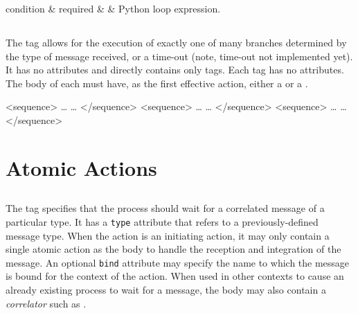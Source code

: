 \begin{attrDefs}
condition	&	required	&			& Python loop expression. \\
\end{attrDefs}

\subsection{}

The  tag allows for the execution of exactly one
of many branches determined by the type of message received,
or a time-out (note, time-out not implemented yet).  It has
no attributes and directly contains only  tags.
Each  tag has no attributes.  The body of each
 must have, as the first effective action, 
either a  or a .

\begin{codelisting}
        <sequence>
            \dots
            \dots
        </sequence>
        <sequence>
            \dots
            \dots
        </sequence>
        <sequence>
            \dots
            \dots
        </sequence>
\end{codelisting}



\section{Atomic Actions}

\subsection{}

The  tag specifies that the process should wait
for a correlated message of a particular type.  It has a \verb|type|
attribute that refers to a previously-defined message type.
When the  action is an initiating action, it may
only contain a single atomic action as the body to handle the
reception and integration of the message.   An optional \verb|bind|
attribute may specify the name to which the message is bound for
the context of the action. When used in other
contexts to cause an already existing process to wait for a message,
the body may also contain a \emph{correlator} such as 
.

